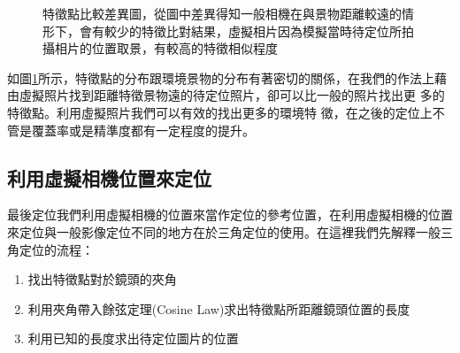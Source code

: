 	\begin{figure}
    	\begin{center}
    	\end{center}
    	\caption{特徵點比較差異圖，從圖中差異得知一般相機在與景物距離較遠的情形下，會有較少的特徵比對結果，虛擬相片因為模擬當時待定位所拍攝相片的位置取景，有較高的特徵相似程度}
    	\label{fig:SIFT_Descriptor_Match}
    \end{figure}
	
	如圖\ref{fig:SIFT_Descriptor_Match}所示，特徵點的分布跟環境景物的分布有著密切的關係，在我們的作法上藉由虛擬照片找到距離特徵景物遠的待定位照片，卻可以比一般的照片找出更
	多的特徵點。利用虛擬照片我們可以有效的找出更多的環境特
	徵，在之後的定位上不管是覆蓋率或是精準度都有一定程度的提升。

\subsection{利用虛擬相機位置來定位}

	最後定位我們利用虛擬相機的位置來當作定位的參考位置，在利用虛擬相機的位置來定位與一般影像定位不同的地方在於三角定位的使用。在這裡我們先解釋一般三角定位的流程：
	\begin{enumerate}
			\item 找出特徵點對於鏡頭的夾角
    		\item 利用夾角帶入餘弦定理(Cosine Law)求出特徵點所距離鏡頭位置的長度
    		\item 利用已知的長度求出待定位圖片的位置
	\end{enumerate}
	
